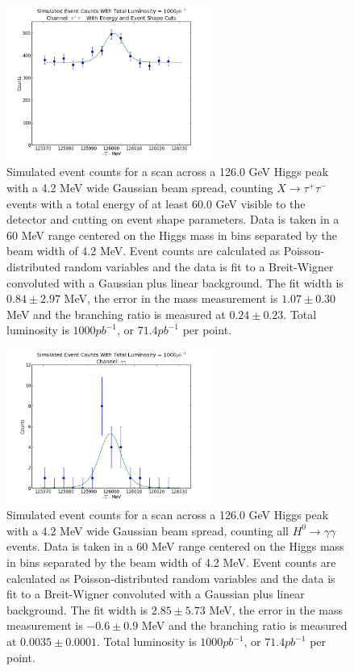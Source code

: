 \documentclass[a4paper]{article}
\begin{document}
\begin{figure}[H]
	\includegraphics[width=0.6\textwidth]{data-fit-tt-cut}
	\caption{Simulated event counts for a scan across a 126.0 GeV Higgs peak with a 4.2 MeV wide Gaussian beam spread, counting $X\rightarrow \tau^+\tau^-$ events with a total energy of at least 60.0 GeV visible to the detector and cutting on event shape parameters. Data is taken in a 60 MeV range centered on the Higgs mass in bins separated by the beam width of 4.2 MeV. Event counts are calculated as Poisson-distributed random variables and the data is fit to a Breit-Wigner convoluted with a Gaussian plus linear background. The fit width is $0.84\pm2.97$ MeV, the error in the mass measurement is $1.07\pm0.30$ MeV and the branching ratio is measured at $0.24\pm0.23$. Total luminosity is $1000pb^{-1}$, or $71.4 pb^{-1}$ per point.}
\label{data-fit-tt-cut}
\end{figure}

\begin{figure}[H]
	\includegraphics[width=0.6\textwidth]{data-fit-gg-cut}
	\caption{Simulated event counts for a scan across a 126.0 GeV Higgs peak with a 4.2 MeV wide Gaussian beam spread, counting all $H^0\rightarrow \gamma\gamma$ events. Data is taken in a 60 MeV range centered on the Higgs mass in bins separated by the beam width of 4.2 MeV. Event counts are calculated as Poisson-distributed random variables and the data is fit to a Breit-Wigner convoluted with a Gaussian plus linear background. The fit width is $2.85\pm5.73$ MeV, the error in the mass measurement is $-0.6\pm0.9$ MeV and the branching ratio is measured at $0.0035\pm0.0001$. Total luminosity is $1000pb^{-1}$, or $71.4 pb^{-1}$ per point.}
\label{data-fit-gg-cut}
\end{figure}
\end{document}
